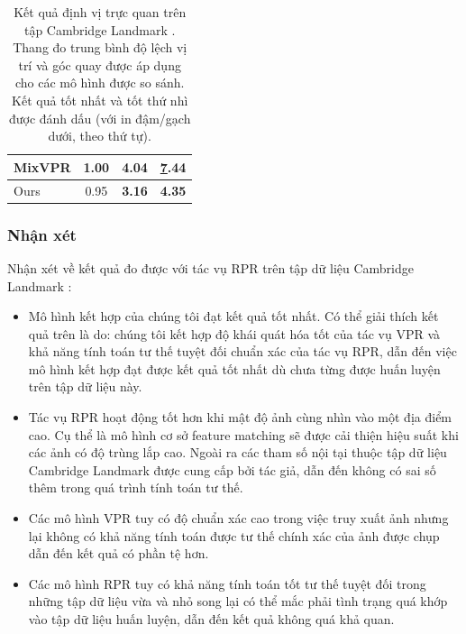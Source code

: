 \begin{table}[]
\begin{tabular}{|l|c|c|c|}
MixVPR \cite{alibey2023mixvpr}         & 1.00                                                     & 4.04                                                        & {\ul 7.44}                                                      \\ \hline
Ours                                           & 0.95                                                     & \textbf{3.16}                                               & \textbf{4.35}                                                   \\ \hline
\end{tabular}
\vspace{10pt}
\caption[Kết quả định vị trực quan trên tập Cambridge Landmark]{Kết quả định vị trực quan trên tập Cambridge Landmark \cite{kendall2016posenet}. Thang đo trung bình độ lệch vị trí và góc quay được áp dụng cho các mô hình được so sánh. Kết quả tốt nhất và tốt thứ nhì được đánh dấu (với in đậm/gạch dưới, theo thứ tự).}
\end{table}
\egroup

\subsubsection*{Nhận xét}
Nhận xét về kết quả đo được với tác vụ RPR trên tập dữ liệu Cambridge Landmark \cite{kendall2016posenet}:
\begin{itemize}
	\item Mô hình kết hợp của chúng tôi đạt kết quả tốt nhất. Có thể giải thích kết quả trên là do: chúng tôi kết hợp độ khái quát hóa tốt của tác vụ VPR và khả năng tính toán tư thế tuyệt đối chuẩn xác của tác vụ RPR, dẫn đến việc mô hình kết hợp đạt được kết quả tốt nhất dù chưa từng được huấn luyện trên tập dữ liệu này. 
	\item Tác vụ RPR hoạt động tốt hơn khi mật độ ảnh cùng nhìn vào một địa điểm cao. Cụ thể là mô hình cơ sở feature matching sẽ được cải thiện hiệu suất khi các ảnh có độ trùng lắp cao. Ngoài ra các tham số nội tại thuộc tập dữ liệu Cambridge Landmark được cung cấp bởi tác giả, dẫn đến không có sai số thêm trong quá trình tính toán tư thế. 
	\item Các mô hình VPR tuy có độ chuẩn xác cao trong việc truy xuất ảnh nhưng lại không có khả năng tính toán được tư thế chính xác của ảnh được chụp dẫn đến kết quả có phần tệ hơn.
	\item Các mô hình RPR tuy có khả năng tính toán tốt tư thế tuyệt đối trong những tập dữ liệu vừa và nhỏ song lại có thể mắc phải tình trạng quá khớp vào tập dữ liệu huấn luyện, dẫn đến kết quả không quá khả quan.
\end{itemize}


